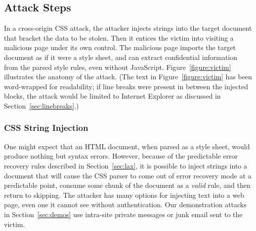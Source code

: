 \documentclass{sig-alternate}
\begin{document}
\subsection{Attack Steps}

In a cross-origin CSS attack, the attacker injects strings into the
target document that bracket the data to be stolen.  Then it entices
the victim into visiting a malicious page under its own control.  The
malicious page imports the target document as if it were a style
sheet, and can extract confidential information from the parsed style
rules, even without JavaScript.  Figure~\ref{figure:victim}
illustrates the anatomy of the attack. (The text in
Figure~\ref{figure:victim} has been word-wrapped for readability; if
line breaks were present in between the injected blocks, the attack
would be limited to Internet Explorer as discussed in Section~\ref{sec:linebreaks}.)

\subsubsection{CSS String Injection}
One might expect that an HTML document, when parsed as a style sheet,
would produce nothing but syntax errors.  However, because of the
predictable error recovery rules described in Section~\ref{sec:lax},
it is possible to inject strings into a document that will cause the
CSS parser to come out of error recovery mode at a predictable point,
consume some chunk of the document as a \emph{valid} rule, and then
return to skipping.  The attacker has many options for injecting text
into a web page, even one it cannot see without authentication.  Our
demonstration attacks in Section~\ref{sec:demos} use intra-site
private messages or junk email sent to the victim.
\end{document}
